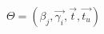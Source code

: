\documentclass[preview,convert={outext=.png,density=1600}]{standalone}
\begin{document}
$\Theta = (\beta_j, \vec{\gamma_i}, \vec{t}, \vec{t_u})$
\end{document}
